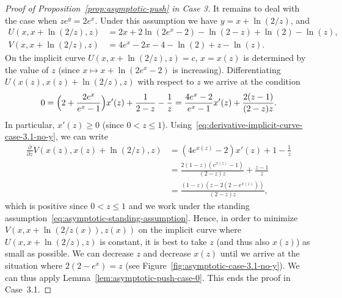 \documentclass[a4paper]{amsart} %
\theoremstyle{definition}
\theoremstyle{remark}
\numberwithin{equation}{section}
\newcommand*{\XXXasymptoticDenominator}{V}
\newcommand*{\XXXasymptoticNominator}{U}
\begin{document}
\begin{proof}[Proof of Proposition~\ref{prop:asymptotic-push} in Case 3]
			It remains to deal with the case when $ze^y = 2e^x$.
			Under this assumption we have  $y = x + \ln(2/z)$, and
				\begin{align*}
				\XXXasymptoticNominator(x,x + \ln(2/z), z)   &= 2x + 2\ln(2e^x-2) - \ln(2-z) + \ln(2) - \ln(z),\\
				\XXXasymptoticDenominator(x,x+\ln(2/z), z) &= 4e^x - 2x - 4 -\ln(2)  + z -\ln(z).
				\end{align*}
				On the implicit curve $\XXXasymptoticNominator(x,x + \ln(2/z), z) = c $,
				$x=x(z)$ is determined by the value of $z$
				(since $x\mapsto x +\ln(2e^x -2)$ is increasing).
				Differentiating  $\XXXasymptoticNominator(x(z),x(z) + \ln(2/z), z)$
				with respect to $z$ we arrive at the condition
				\begin{equation}
				\label{eq:derivative-implicit-curve-case-3.1-no-y}
				0 = \Bigl(2 + \frac{2e^x}{e^x - 1}\Bigr) x'(z) + \frac{1}{2-z} - \frac{1}{z} = \frac{4e^x - 2 }{e^x - 1}x'(z) +\frac{2(z-1)}{(2-z)z}.
				\end{equation}
				In particular, $x'(z) \geq 0$ (since $0<z\leq 1$).
				Using~\eqref{eq:derivative-implicit-curve-case-3.1-no-y}, we can write
				\begin{align*}
				\frac{\partial }{\partial z} \XXXasymptoticDenominator(x(z),x(z)+\ln(2/z), z) 
				&=(4e^{x(z)} -2) x'(z) + 1 - \frac{1}{z}\\
				&=   \frac{2(1-z)(e^{x(z)} -1)}{(2-z)z} + \frac{z-1}{z}\\
				&= \frac{(1-z)( z - 2(2-e^{x(z)}))}{(2-z)z}, 
				\end{align*}
				which is positive since $0<z\leq 1$ and  
				we work under the standing assumption~\eqref{eq:asymptotic-standing-assumption}.
				Hence, in order to minimize $\XXXasymptoticDenominator(x,x+\ln(2/z(x)), z(x))$
				on the implicit curve where $\XXXasymptoticNominator(x,x + \ln(2/z), z)$ is constant,
				it is best to take $z$ (and thus also $x(z)$) as small as possible.
				We can decrease $z$ and decrease $x(z)$ until we arrive at the situation where $2(2-e^x)  = z$ (see Figure~\ref{fig:asymptotic-case-3.1-no-y}).
				We can thus apply Lemma~\ref{lem:asymptotic-push-case-0}.
			    This ends the proof in Case~3.1.






\end{proof}
\end{document}
